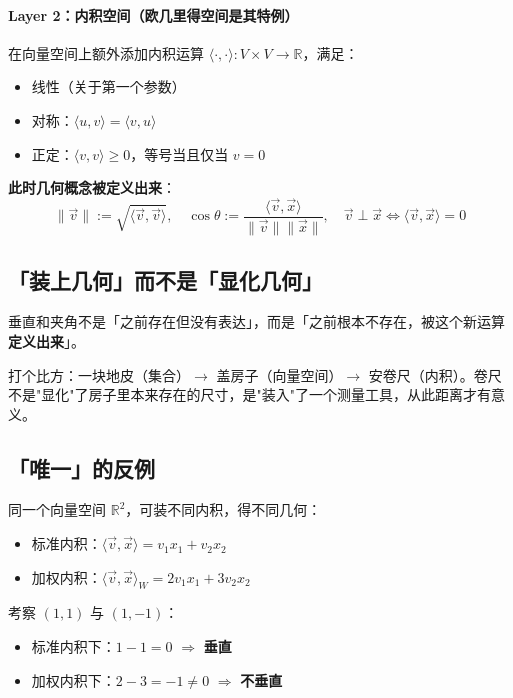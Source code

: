 \documentclass[11pt,a4paper]{article}
\begin{document}
\paragraph{Layer 2：内积空间（欧几里得空间是其特例）}

在向量空间上额外添加内积运算 $\langle\cdot,\cdot\rangle: V \times V \to \mathbb{R}$，满足：
\begin{itemize}
    \item 线性（关于第一个参数）
    \item 对称：$\langle u, v\rangle = \langle v, u\rangle$
    \item 正定：$\langle v, v\rangle \geq 0$，等号当且仅当 $v = 0$
\end{itemize}

\textbf{此时几何概念被定义出来}：
$$\|\vec{v}\| := \sqrt{\langle \vec{v}, \vec{v}\rangle}, \quad \cos\theta := \frac{\langle \vec{v}, \vec{x}\rangle}{\|\vec{v}\|\|\vec{x}\|}, \quad \vec{v} \perp \vec{x} \iff \langle \vec{v}, \vec{x}\rangle = 0$$

\subsection{「装上几何」而不是「显化几何」}

\begin{insight}
    垂直和夹角不是「之前存在但没有表达」，而是「之前根本不存在，被这个新运算\textbf{定义出来}」。

    \medskip

    打个比方：一块地皮（集合）$\to$ 盖房子（向量空间）$\to$ 安卷尺（内积）。卷尺不是"显化"了房子里本来存在的尺寸，是"装入"了一个测量工具，从此距离才有意义。
\end{insight}

\subsection{「唯一」的反例}

同一个向量空间 $\mathbb{R}^2$，可装不同内积，得不同几何：
\begin{itemize}
    \item 标准内积：$\langle \vec{v}, \vec{x}\rangle = v_1 x_1 + v_2 x_2$
    \item 加权内积：$\langle \vec{v}, \vec{x}\rangle_W = 2v_1 x_1 + 3 v_2 x_2$
\end{itemize}

考察 $(1,1)$ 与 $(1,-1)$：
\begin{itemize}
    \item 标准内积下：$1 - 1 = 0$ $\Rightarrow$ \textbf{垂直}
    \item 加权内积下：$2 - 3 = -1 \neq 0$ $\Rightarrow$ \textbf{不垂直}
\end{itemize}
\end{document}
